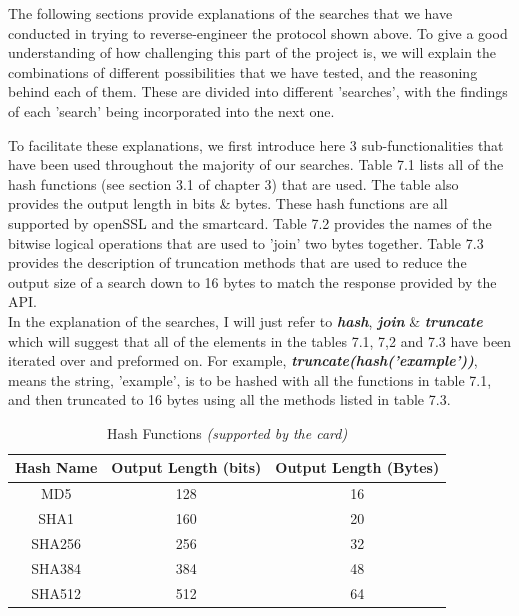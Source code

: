 \documentclass[bsc,frontabs,twoside,singlespacing,parskip,deptreport]{infthesis}     %
\begin{document}
The following sections provide explanations of the searches that we have conducted in trying to reverse-engineer the protocol shown above. To give a good understanding of how challenging this part of the project is, we will explain the combinations of different possibilities that we have tested, and the reasoning behind each of them. These are divided into different 'searches', with the findings of each 'search' being incorporated into the next one.

To facilitate these explanations, we first introduce here 3 sub-functionalities that have been used throughout the majority of our searches. Table 7.1 lists all of the hash functions (see section 3.1 of chapter 3) that are used. The table also provides the output length in bits \& bytes. These hash functions are all supported by openSSL and the smartcard. Table 7.2 provides the names of the bitwise logical operations that are used to 'join' two bytes together. Table 7.3 provides the description of truncation methods that are used to reduce the output size of a search down to 16 bytes to match the response provided by the API. \\

In the explanation of the searches, I will just refer to \textbf{\textit{hash}}, \textbf{\textit{join}} \& \textbf{\textit{truncate}} which will suggest that all of the elements in the tables 7.1, 7,2 and 7.3 have been iterated over and preformed on. For example, \textbf{\textit{truncate(hash('example'))}}, means the string, 'example', is to be hashed with all the functions in table 7.1, and then truncated to 16 bytes using all the methods listed in table 7.3.\\


\begin{table}[H]
\begin{center}
\begin{tabular}{|c|c|c|}
\hline
Hash Name & Output Length (bits) & Output Length (Bytes)\\
\hline

MD5 & 128 &16\\
SHA1 & 160 & 20\\
SHA256 & 256 & 32\\
SHA384 & 384 & 48\\
SHA512 & 512 & 64\\
\hline
\end{tabular}
\caption{Hash Functions \textit{(supported by the card)}}
\end{center}
\end{table}
\end{document}
